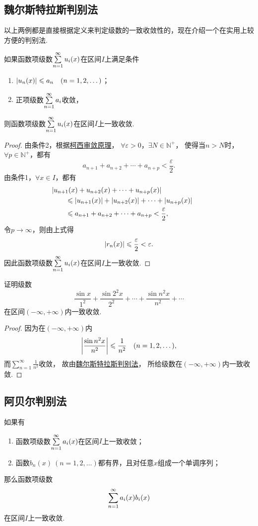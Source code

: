 \subsection{魏尔斯特拉斯判别法}
以上两例都是直接根据定义来判定级数的一致收敛性的，现在介绍一个在实用上较方便的判别法.
\begin{theorem}[魏尔斯特拉斯判别法]\label{theorem:无穷级数.魏尔斯特拉斯判别法}
如果函数项级数\(\sum\limits_{n=1}^\infty u_i(x)\)在区间\(I\)上满足条件\begin{enumerate}
\item \(\abs{u_n(x)} \leqslant a_n \quad(n=1,2,\dotsc)\)；
\item 正项级数\(\sum\limits_{n=1}^\infty a_i\)收敛，%
\end{enumerate}
则函数项级数\(\sum\limits_{n=1}^\infty u_i(x)\)在区间\(I\)上一致收敛.
\begin{proof}
由条件2，根据\hyperref[theorem:无穷级数.级数的柯西审敛原理]{柯西审敛原理}，%
\(\forall\varepsilon>0\)，\(\exists N \in \mathbb{N}^+\)，%
使得当\(n > N\)时，\(\forall p \in \mathbb{N}^+\)，都有\[
a_{n+1} + a_{n+2} + \dotsb + a_{n+p} < \frac{\varepsilon}{2}.
\]由条件1，\(\forall x \in I\)，都有\begin{align*}
&\hspace{-20pt}\abs{u_{n+1}(x) + u_{n+2}(x) + \dotsb + u_{n+p}(x)} \\
&\leqslant \abs{u_{n+1}(x)} + \abs{u_{n+2}(x)} + \dotsb + \abs{u_{n+p}(x)} \\
&\leqslant a_{n+1} + a_{n+2} + \dotsb + a_{n+p} < \frac{\varepsilon}{2},
\end{align*}令\(p\to\infty\)，则由上式得\[
\abs{r_n(x)} \leqslant \frac{\varepsilon}{2} < \varepsilon.
\]因此函数项级数\(\sum\limits_{n=1}^\infty u_i(x)\)在区间\(I\)上一致收敛.
\end{proof}
\end{theorem}

\begin{example}
证明级数\[
\frac{\sin x}{1^2}
+ \frac{\sin 2^2 x}{2^2}
+ \dotsb
+ \frac{\sin n^2 x}{n^2}
+ \dotsb
\]在区间\((-\infty,+\infty)\)内一致收敛.
\begin{proof}
因为在\((-\infty,+\infty)\)内\[
\abs{\frac{\sin n^2 x}{n^2}} \leqslant \frac{1}{n^2}
\quad(n=1,2,\dotsc),
\]而\(\sum\limits_{n=1}^\infty \frac{1}{n^2}\)收敛，%
故由\hyperref[theorem:无穷级数.魏尔斯特拉斯判别法]{魏尔斯特拉斯判别法}，%
所给级数在\((-\infty,+\infty)\)内一致收敛.
\end{proof}
\end{example}

\subsection{阿贝尔判别法}
\begin{theorem}[阿贝尔判别法]\label{theorem:无穷级数.阿贝尔判别法}
如果有
\begin{enumerate}
\item 函数项级数\(\sum\limits_{n=1}^\infty a_i(x)\)在区间\(I\)上一致收敛；
\item 函数\(b_n(x)\ (n=1,2,\dotsc)\)都有界，且对任意\(x\)组成一个单调序列；
\end{enumerate}
那么函数项级数\[
\sum\limits_{n=1}^\infty a_i(x) b_i(x)
\]
在区间\(I\)上一致收敛.
\end{theorem}

